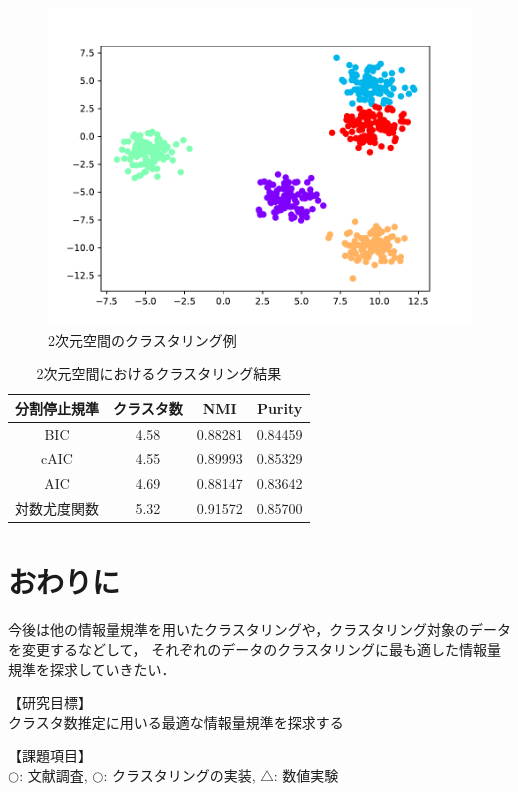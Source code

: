 \documentclass[twocolumn, 10.5pt,a4j]{ltjsarticle}
\begin{document}
\begin{figure}[htbp]
  \begin{center}
    \includegraphics[width=1.0\linewidth]{./img/BIC_2.pdf}
      \caption{2次元空間のクラスタリング例}
      \label{fig:2dim}
  \end{center}
\end{figure}
\begin{table}[htb]
  \centering
  \caption{2次元空間におけるクラスタリング結果}
  \label{table:2dim}
  \begin{tabular}{|c|c|c|c|} \hline
    分割停止規準 & クラスタ数 & NMI & Purity \\\hline
    BIC  & 4.58 & 0.88281 & 0.84459\\
    cAIC & 4.55 & 0.89993 & 0.85329\\
    AIC  & 4.69 & 0.88147 & 0.83642\\
    対数尤度関数 & 5.32 & 0.91572 & 0.85700\\\hline
  \end{tabular}
\end{table}

\section{おわりに}
今後は他の情報量規準を用いたクラスタリングや，クラスタリング対象のデータを変更するなどして，
それぞれのデータのクラスタリングに最も適した情報量規準を探求していきたい．

\vspace{1em}
\noindent【研究目標】\\
クラスタ数推定に用いる最適な情報量規準を探求する

\vspace{1em}
\noindent【課題項目】\\
$\bigcirc$: 文献調査, $\bigcirc$: クラスタリングの実装, $\bigtriangleup$: 数値実験\noindent
\end{document}

